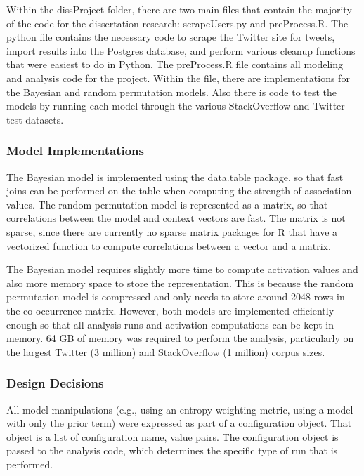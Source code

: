 \documentclass[man,floatsintext,donotrepeattitle]{apa6}
\begin{document}
Within the dissProject folder, there are two main files that contain the majority of the code for the dissertation research: scrapeUsers.py and preProcess.R.
The python file contains the necessary code to scrape the Twitter site for tweets, import results into the Postgres database, and perform various cleanup functions that were easiest to do in Python.
The preProcess.R file contains all modeling and analysis code for the project.
Within the file, there are implementations for the Bayesian and random permutation models.
Also there is code to test the models by running each model through the various StackOverflow and Twitter test datasets.

\subsubsection{Model Implementations}

The Bayesian model is implemented using the data.table package, so that fast joins can be performed on the table when computing the strength of association values.
The random permutation model is represented as a matrix, so that correlations between the model and context vectors are fast.
The matrix is not sparse, since there are currently no sparse matrix packages for R that have a vectorized function to compute correlations between a vector and a matrix.

The Bayesian model requires slightly more time to compute activation values and also more memory space to store the representation.
This is because the random permutation model is compressed and only needs to store around \num{2048} rows in the co-occurrence matrix.
However, both models are implemented efficiently enough so that all analysis runs and activation computations can be kept in memory.
64 GB of memory was required to perform the analysis, particularly on the largest Twitter (3 million) and StackOverflow (1 million) corpus sizes.

\subsubsection{Design Decisions}

All model manipulations (e.g., using an entropy weighting metric, using a model with only the prior term) were expressed as part of a configuration object.
That object is a list of configuration name, value pairs.
The configuration object is passed to the analysis code, which determines the specific type of run that is performed.
\end{document}
